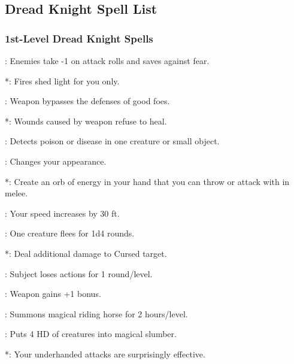 \subsection{Dread Knight Spell List}
\subsubsection{1st-Level Dread Knight Spells}
\begin{list}{}{\leftmargin=1em}
\item {}: Enemies take -1 on attack rolls and saves against fear.
\item {}*: Fires shed light for you only.
\item {}: Weapon bypasses the defenses of good foes.
\item {}*: Wounds caused by weapon refuse to heal.
\item {}: Detects poison or disease in one creature or small object.
\item {}: Changes your appearance.
\item {}*: Create an orb of energy in your hand that you can throw or attack with in melee.
\item {}: Your speed increases by 30 ft.
\item {}: One creature flees for 1d4 rounds.
\item {}*: Deal additional damage to Cursed target.
\item {}: Subject loses actions for 1 round/level.
\item {}: Weapon gains +1 bonus.
\item {}: Summons magical riding horse for 2 hours/level.
\item {}: Puts 4 HD of creatures into magical slumber.
\item {}*: Your underhanded attacks are surprisingly effective.
\end{list}
